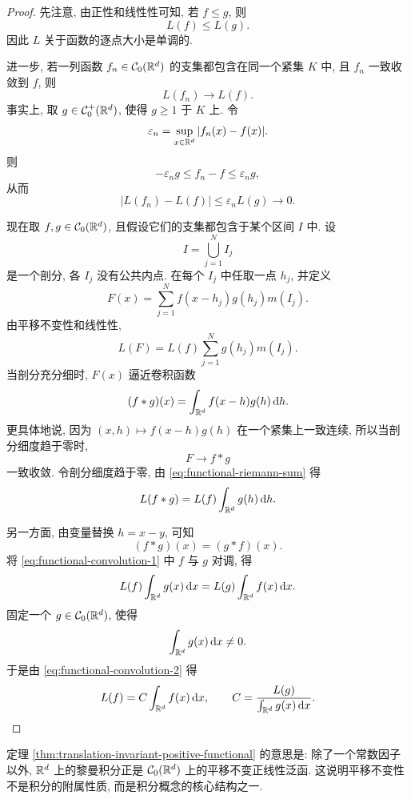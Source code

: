 \begin{proof}
	先注意, 由正性和线性性可知, 若 \(f\leq g\), 则
	\[
	L(f)\leq L(g).
	\]
	因此 \(L\) 关于函数的逐点大小是单调的.
	
	进一步, 若一列函数 \(f_n\in\mathcal{C}_0(\mathbb{R}^d)\) 的支集都包含在同一个紧集 \(K\) 中, 且 \(f_n\) 一致收敛到 \(f\), 则
	\[
	L(f_n)\longrightarrow L(f).
	\]
	事实上, 取 \(g\in\mathcal{C}_0^+(\mathbb{R}^d)\), 使得 \(g\geq 1\) 于 \(K\) 上. 令
	\[
	\varepsilon_n=\sup_{x\in\mathbb{R}^d}|f_n(x)-f(x)|.
	\]
	则
	\[
	-\varepsilon_n g\leq f_n-f\leq \varepsilon_n g,
	\]
	从而
	\[
	|L(f_n)-L(f)|\leq \varepsilon_n L(g)\to0.
	\]
	
	现在取 \(f,g\in\mathcal{C}_0(\mathbb{R}^d)\), 且假设它们的支集都包含于某个区间 \(I\) 中. 设
	\[
	I=\bigcup_{j=1}^{N}I_j
	\]
	是一个剖分, 各 \(I_j\) 没有公共内点. 在每个 \(I_j\) 中任取一点 \(h_j\), 并定义
	\[
	F(x)=\sum_{j=1}^{N}f(x-h_j)g(h_j)m(I_j).
	\]
	由平移不变性和线性性,
	\begin{equation}
		L(F)=L(f)\sum_{j=1}^{N}g(h_j)m(I_j).
		\label{eq:functional-riemann-sum}
	\end{equation}
	当剖分充分细时, \(F(x)\) 逼近卷积函数
	\[
	(f*g)(x)=\int_{\mathbb{R}^d}f(x-h)g(h)\,\dd h.
	\]
	更具体地说, 因为 \((x,h)\mapsto f(x-h)g(h)\) 在一个紧集上一致连续, 所以当剖分细度趋于零时,
	\[
	F\longrightarrow f*g
	\]
	一致收敛. 令剖分细度趋于零, 由 \eqref{eq:functional-riemann-sum} 得
	\begin{equation}
		L(f*g)=L(f)\int_{\mathbb{R}^d}g(h)\,\dd h.
		\label{eq:functional-convolution-1}
	\end{equation}
	
	另一方面, 由变量替换 \(h=x-y\), 可知
	\[
	(f*g)(x)=(g*f)(x).
	\]
	将 \eqref{eq:functional-convolution-1} 中 \(f\) 与 \(g\) 对调, 得
	\begin{equation}
		L(f)\int_{\mathbb{R}^d}g(x)\,\dd x
		=
		L(g)\int_{\mathbb{R}^d}f(x)\,\dd x.
		\label{eq:functional-convolution-2}
	\end{equation}
	固定一个 \(g\in\mathcal{C}_0(\mathbb{R}^d)\), 使得
	\[
	\int_{\mathbb{R}^d}g(x)\,\dd x\neq0.
	\]
	于是由 \eqref{eq:functional-convolution-2} 得
	\[
	L(f)=C\int_{\mathbb{R}^d}f(x)\,\dd x,
	\qquad
	C=\frac{L(g)}{\int_{\mathbb{R}^d}g(x)\,\dd x}.
	\]
\end{proof}

\begin{rem}
	定理 \ref{thm:translation-invariant-positive-functional} 的意思是: 除了一个常数因子以外, \(\mathbb{R}^d\) 上的黎曼积分正是 \(\mathcal{C}_0(\mathbb{R}^d)\) 上的平移不变正线性泛函. 这说明平移不变性不是积分的附属性质, 而是积分概念的核心结构之一.
\end{rem}

